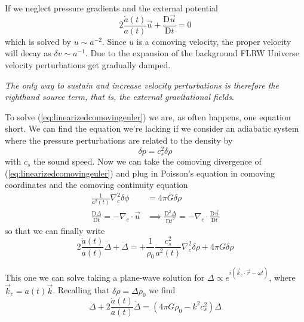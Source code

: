 \begin{tcolorbox}[enhanced,attach boxed title to top center={yshift=-3mm,yshifttext=-1mm},
  colback=blue!5!white,colframe=blue!75!black,colbacktitle=blue!80!black,
  title=Special case,
  boxed title style={size=small,colframe=blue!50!black}]
  If we neglect pressure gradients and the external potential
  $$ 2\frac{\dot{a}(t)}{a(t)}\vec{u}+\frac{\text{D}\vec{u}}{\text{D}t} = 0$$
  which is solved by $u \sim a^{-2}$. Since $u$ is a comoving velocity, the proper velocity will decay as $\delta v \sim a^{-1}$. Due to the expansion of the background FLRW Universe velocity perturbations get gradually damped.
  \par \emph{The only way to sustain and increase velocity perturbations is therefore the righthand source term, that is, the external gravitational fields}.
\end{tcolorbox}
\par To solve (\ref{eq:linearizedcomovingeuler}) we are, as often happens, one equation short. We can find the equation we're lacking if we consider an adiabatic system where the pressure perturbations are related to the density by
\begin{equation}
    \delta p = c_{s}^{2}\delta\rho
    \label{eq:adiabatic_eos}
\end{equation}
with $c_{s}$ the sound speed. Now we can take the comoving divergence of (\ref{eq:linearizedcomovingeuler}) and plug in Poisson's equation in comoving coordinates and the comoving continuity equation
\begin{align*}
    \frac{1}{a^{2}(t)}\nabla_{c}^{2}\delta\phi &= 4\pi G\delta\rho\\
    \frac{\text{D}\Delta}{\text{D}t} = -\nabla_{c}\cdot\vec{u} &\implies \frac{\text{D}^{2}\Delta}{\text{D}t^{2}} = -\nabla_{c}\cdot\frac{\text{D}\vec{u}}{\text{D}t}
\end{align*}
so that we can finally write
\begin{equation}
    \boxed{
    2\frac{\dot{a}(t)}{a(t)}\dot{\Delta}+\ddot{\Delta} = +\frac{1}{\rho_{0}}\frac{c_{s}^{2}}{a^{2}(t)}\nabla_{c}^{2}\delta\rho +4\pi G\delta\rho
    }
    \label{eq:comovingcontrast_eq}
\end{equation}
\par This one we can solve taking a plane-wave solution for $\Delta \propto e^{i(\vec{k}_{c}\cdot\vec{r}-\omega t)}$, where $\vec{k}_{c} = a(t)\vec{k}$. Recalling that $\delta\rho = \Delta\rho_{0}$ we find
\begin{equation}
    \ddot{\Delta} + 2\frac{\dot{a}(t)}{a(t)}\dot{\Delta} = (4\pi G\rho_{0}-k^{2}c_{s}^{2})\Delta
    \label{eq:comovingcontrast_ft}
\end{equation}
